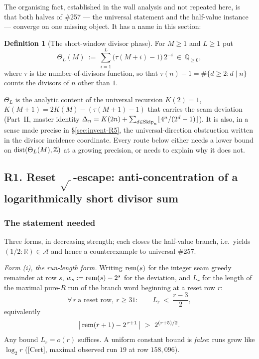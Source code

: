 \documentclass[11pt]{article}
\theoremstyle{plain}
\theoremstyle{definition}
\newtheorem{defn}[thm]{Definition}
\theoremstyle{remark}
\let\origmathrm\mathrm
\renewcommand{\mathrm}[1]{\ifmmode\origmathrm{#1}\else\textrm{#1}\fi}%
\newcommand{\ev}[1]{{\small\textsf{[#1]}}\xspace}
\newcommand{\Z}{\mathbb{Z}}
\newcommand{\Q}{\mathbb{Q}}
\newcommand{\R}{\mathbb{R}}
\begin{document}
The organising fact, established in the wall analysis and not repeated here, is that both halves
of \#257 --- the universal statement and the half-value instance --- converge on one missing
object. It has a name in this section:

\begin{defn}[The short-window divisor phase]
\label{defn:theta}
For $M\ge 1$ and $L\ge 1$ put
\[
\Theta_L(M)\ :=\ \sum_{i=1}^{L}\bigl(\tau(M+i)-1\bigr)\,2^{-i}\ \in\ \Q_{\ge 0},
\]
where $\tau$ is the number-of-divisors function, so that $\tau(n)-1=\#\{d\ge 2: d\mid n\}$ counts
the divisors of $n$ other than $1$.
\end{defn}

$\Theta_L$ is the analytic content of the universal recursion $K(2)=1$,
$K(M+1)=2K(M)-(\tau(M+1)-1)$ that carries the seam deviation (Part~II, master identity
$\Delta_n = K(2n)+\sum_{d\in\mathrm{Skip}_n}\lfloor 4^n/(2^d-1)\rfloor$). It is also, in a sense
made precise in \S\ref{sec:invent-R5}, the universal-direction obstruction written in the divisor
incidence coordinate. Every route below either needs a lower bound on
$\mathrm{dist}(\Theta_L(M),\Z)$ at a growing precision, or needs to explain why it does not.

\subsection{R1. Reset \texorpdfstring{\(\sqrt{\ }\)}{square-root}-escape:
anti-concentration of a logarithmically short divisor sum}
\label{sec:invent-R1}

\subsubsection*{The statement needed}

Three forms, in decreasing strength; each closes the half-value branch, i.e.\ yields
$(1/2:\R)\in\mathcal{A}$ and hence a counterexample to universal \#257.

\emph{Form (i), the run-length form.} Writing $\mathrm{rem}(s)$ for the integer seam greedy
remainder at row $s$, $w_s := \mathrm{rem}(s)-2^{s}$ for the deviation, and $L_r$ for the length
of the maximal pure-$R$ run of the branch word beginning at a reset row $r$:
\[
\forall\, r\ \text{a reset row},\ r\ge 31:\qquad L_r\ <\ \frac{r-3}{2},
\]
equivalently
\[
\bigl|\,\mathrm{rem}(r+1)-2^{\,r+1}\,\bigr|\ >\ 2^{(r+5)/2}.
\]
Any bound $L_r=o(r)$ suffices. A uniform constant bound is \emph{false}: runs grow like
$\log_2 r$ (\ev{Cert}, maximal observed run $19$ at row $158{,}096$).
\end{document}
